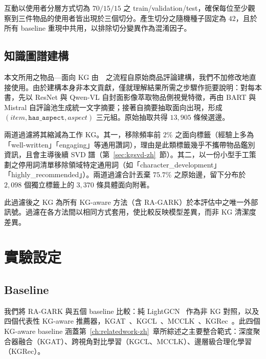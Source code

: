 互動以使用者分層方式切為 $70/15/15$ 之 train/validation/test，確保每位至少觀察到三件物品的使用者皆出現於三個切分。產生切分之隨機種子固定為 $42$，且於所有 baseline 重現中共用，以排除切分變異作為混淆因子。

\subsection{知識圖譜建構}
\label{sec:eval-dataset-kg-zh}

本文所用之物品—面向 KG 由~\cite{ho2024reviewkg}~之流程自原始商品評論建構，我們不加修改地直接使用。由於建構本身非本文貢獻，僅就理解結果所需之步驟作扼要說明：對每本書，先以 ResNet 與 Qwen-VL 自封面影像萃取物品側視覺特徵，再由 BART 與 Mistral 自評論池生成統一文字摘要；接著自摘要抽取面向出現，形成 $(\textit{item}, \texttt{has\_aspect}, \textit{aspect})$ 三元組。原始抽取共得 $13{,}905$ 條候選邊。

兩道過濾將其縮減為工作 KG。其一，移除頻率前 $2\%$ 之面向標籤（經驗上多為「well-written」「engaging」等通用讚詞），理由是此類標籤幾乎不攜帶物品鑑別資訊，且會主導後續 SVD 譜（第~\ref{sec:kgsvd-zh}~節）。其二，以一份小型手工策劃之停用詞清單移除領域特定通用詞（如「character\_development」「highly\_recommended」）。兩道過濾合計丟棄 $75.7\%$ 之原始邊，留下分布於 $2{,}098$ 個獨立標籤上的 $3{,}370$ 條具體面向附著。

此過濾後之 KG 為所有 KG-aware 方法（含 RA-GARK）於本評估中之唯一外部訊號。過濾在各方法間以相同方式套用，使比較反映模型差異，而非 KG 清潔度差異。

\section{實驗設定}
\label{sec:eval-setup-zh}

\subsection{Baseline}
\label{sec:eval-baselines-zh}

我們將 RA-GARK 與五個 baseline 比較：純 LightGCN~\cite{he2020lightgcn} 作為非 KG 對照，以及四個代表性 KG-aware 推薦器，KGAT~\cite{wang2019kgat}、KGCL~\cite{yang2022kgcl}、MCCLK~\cite{zou2022mcclk}、KGRec~\cite{yang2023kgrec}。此四個 KG-aware baseline 涵蓋第~\ref{ch:relatedwork-zh}~章所綜述之主要整合範式：深度聚合器融合（KGAT）、跨視角對比學習（KGCL、MCCLK）、邊層級合理化學習（KGRec）。

